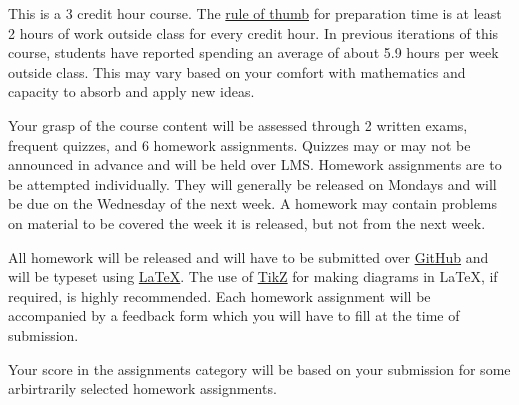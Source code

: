 \documentclass[a4paper]{article}
\begin{document}
This is a 3 credit hour course. The \href{https://www.lasc.edu/students/Credit%20Hour%20Definition%20for%20LASC.pdf}{rule of thumb} for preparation time is at least 2 hours of work outside class for every credit hour. In previous iterations of this course, students have reported spending an average of about 5.9 hours per week outside class. This may vary based on your comfort with mathematics and capacity to absorb and apply new ideas.

Your grasp of the course content will be assessed through 2 written exams, frequent quizzes, and 6 homework assignments. Quizzes may or may not be announced in advance and will be held over LMS. Homework assignments are to be attempted individually. They will generally be released on Mondays and will be due on the Wednesday of the next week. A homework may contain problems on material to be covered the week it is released, but not from the next week.

All homework will be released and will have to be submitted over \href{https://github.com/}{GitHub} and will be typeset using \href{https://tobi.oetiker.ch/lshort/lshort.pdf}{\LaTeX}. The use of \href{https://www.overleaf.com/learn/latex/LaTeX_Graphics_using_TikZ:_A_Tutorial_for_Beginners_(Part_1)—Basic_Drawing}{TikZ} for making diagrams in \LaTeX, if required, is highly recommended. Each homework assignment will be accompanied by a feedback form which you will have to fill at the time of submission.

Your score in the assignments category will be based on your submission for some arbirtrarily selected homework assignments.
\end{document}
